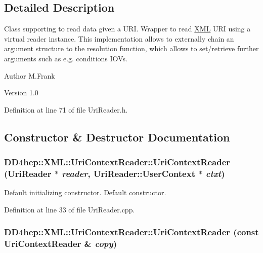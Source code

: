 \subsection{Detailed Description}
Class supporting to read data given a URI. Wrapper to read \hyperlink{namespace_d_d4hep_1_1_x_m_l}{XML} URI using a virtual reader instance. This implementation allows to externally chain an argument structure to the resolution function, which allows to set/retrieve further arguments such as e.g. conditions IOVs.

\begin{DoxyAuthor}{Author}
M.Frank 
\end{DoxyAuthor}
\begin{DoxyVersion}{Version}
1.0 
\end{DoxyVersion}


Definition at line 71 of file UriReader.h.

\subsection{Constructor \& Destructor Documentation}
\hypertarget{class_d_d4hep_1_1_x_m_l_1_1_uri_context_reader_aede2321d47f8d747c084287e367b35ac}{
\subsubsection[{UriContextReader}]{\setlength{\rightskip}{0pt plus 5cm}DD4hep::XML::UriContextReader::UriContextReader ({\bf UriReader} $\ast$ {\em reader}, \/  {\bf UriReader::UserContext} $\ast$ {\em ctxt})}}
\label{class_d_d4hep_1_1_x_m_l_1_1_uri_context_reader_aede2321d47f8d747c084287e367b35ac}


Default initializing constructor. Default constructor. 

Definition at line 33 of file UriReader.cpp.\hypertarget{class_d_d4hep_1_1_x_m_l_1_1_uri_context_reader_ae8808c053cfc81ddff19c1be89f95e6e}{
\subsubsection[{UriContextReader}]{\setlength{\rightskip}{0pt plus 5cm}DD4hep::XML::UriContextReader::UriContextReader (const {\bf UriContextReader} \& {\em copy})}}
\label{class_d_d4hep_1_1_x_m_l_1_1_uri_context_reader_ae8808c053cfc81ddff19c1be89f95e6e}


